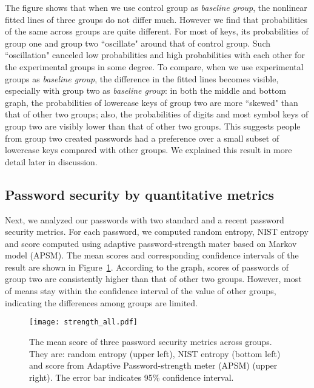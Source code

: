 \documentclass[conference]{IEEEtran}
\begin{document}
The figure shows that when we use control group as \emph{baseline group}, the nonlinear fitted lines of three groups do not differ much. However we find that probabilities of the same across groups are quite different. For most of keys, its probabilities of group one and group two ``oscillate" around that of control group. Such ``oscillation" canceled low probabilities and high probabilities with each other for the experimental groups in some degree. To compare, when we use experimental groups as \emph{baseline group}, the difference in the fitted lines becomes visible, especially with group two as \emph{baseline group}: in both the middle and bottom graph, the probabilities of lowercase keys of group two are more ``skewed" than that of other two groups; also, the probabilities of digits and most symbol keys of group two are visibly lower than that of other two groups. This suggests people from group two created passwords had a preference over a small subset of lowercase keys compared with other groups. We explained this result in more detail later in discussion. 





\subsection{Password security by quantitative metrics}

Next, we analyzed our passwords with two standard and a recent password security metrics. For each password, we computed random entropy, NIST entropy and score computed using adaptive password-strength mater based on Markov model (APSM). The mean scores and corresponding confidence intervals of the result are shown in Figure~\ref{fig:strength_length}. According to the graph, scores of passwords of group two are consistently higher than that of other two groups. However, most of means stay within the confidence interval of the value of other groups, indicating the differences among groups are limited. 

\begin{figure}[htbp]
\texttt{[image: strength\_all.pdf]}
\caption{\label{fig:strength_length} The mean score of three password security metrics across groups. They are: random entropy (upper left), NIST entropy (bottom left) and score from Adaptive Password-strength meter (APSM) (upper right). The error bar indicates 95\% confidence interval.}
\vspace{-9pt}
\end{figure}
\end{document}
